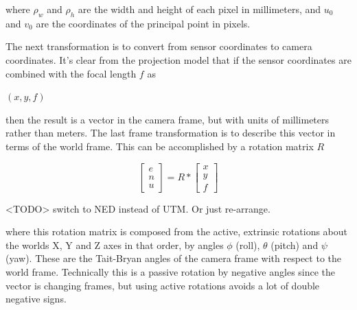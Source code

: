  where $\rho_w$ and $\rho_h$ are the width and height of each pixel in millimeters, and $u_0$ and $v_0$ are the  coordinates of the principal point in pixels. 
 
 The next transformation is to convert from sensor coordinates to camera coordinates.  It's clear from the projection model that if the sensor coordinates are combined with the focal length $f$ as
 \begin{center}
 $(x,y,f)$
 \end{center}
 then the result is a vector in the camera frame, but with units of millimeters rather than meters. The last frame transformation is to describe this vector in terms of the world frame.  This can be accomplished by a rotation matrix $R$
 
 \begin{equation}
 \label{rotation_eq}
 \begin{bmatrix} e \\ n \\ u \end{bmatrix}
 =
 R *
 \begin{bmatrix} x \\ y \\ f \end{bmatrix}
 \end{equation}
 
 <TODO> switch to NED instead of UTM. Or just re-arrange.
 
 where this rotation matrix is composed from the active, extrinsic rotations about the worlds X, Y and Z axes in that order, by angles $\phi$ (roll), $\theta$ (pitch) and $\psi$ (yaw).  These are the Tait-Bryan angles of the camera frame with respect to the world frame.  Technically this is a passive rotation by negative angles since the vector is changing frames, but using active rotations avoids a lot of double negative signs.
 

